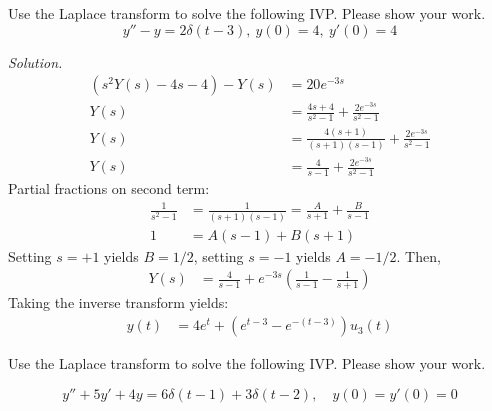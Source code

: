 \ifnum {}
\newpage 
\question[5] Use the Laplace transform to solve the following IVP. Please show your work. $$y''-y=2\delta(t-3),\ y(0)=4,\ y'(0)=4$$
    \ifnum {} {\color{DarkBlue} 
    
    \textit{Solution.} 
    \begin{align}
    (s^2Y(s)-4s-4)-Y(s)&=20e^{-3s} \\
    Y(s)&=\frac{4s+4}{s^2-1}+\frac{2e^{-3s}}{s^2-1} \\
    Y(s)&=\frac{4(s+1)}{(s+1)(s-1)}+\frac{2e^{-3s}}{s^2-1} \\
    Y(s)&=\frac{4}{s-1}+\frac{2e^{-3s}}{s^2-1} 
    \end{align}
    Partial fractions on second term:
    \begin{align}
        \frac{1}{s^2-1} &= \frac{1}{(s+1)(s-1)} = \frac{A}{s+1} + \frac{B}{s-1} \\
        1 &= A(s-1) + B(s+1)
    \end{align}
    Setting $s=+1$ yields $B=1/2$, setting $s=-1$ yields $A=-1/2$. Then,
    \begin{align}
    Y(s) &= \frac{4}{s-1} + e^{-3s}\left(\frac{1}{s-1}-\frac{1}{s+1}\right) 
    \end{align}   
    Taking the inverse transform yields:
    \begin{align}
    y(t)&=4e^{t}+ (e^{t-3}-e^{-(t-3)})u_3(t) 
    \end{align}    
    
    } 
    \else
    \vfill
    \fi

\fi




\ifnum {}
\ifnum {} \newpage \fi
\question[5] Use the Laplace transform to solve the following IVP. Please show your work. 

    $$ y''+ 5y' + 4 y =  6\delta(t - 1) + 3\delta(t - 2), \quad y(0) = y'(0) = 0$$  

